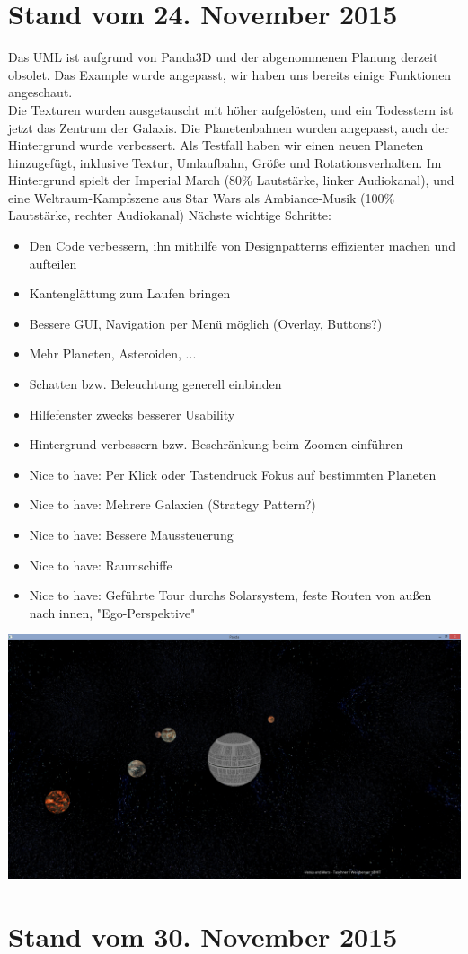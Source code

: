 \documentclass[12pt,a4paper,oneside,ngerman]{scrartcl}
\begin{document}
\section{Stand vom 24. November 2015}
Das UML ist aufgrund von Panda3D und der abgenommenen Planung derzeit obsolet.
Das Example wurde angepasst, wir haben uns bereits einige Funktionen angeschaut. \\
Die Texturen wurden ausgetauscht mit höher aufgelösten, und ein Todesstern ist jetzt das Zentrum der Galaxis. Die Planetenbahnen wurden angepasst, auch der Hintergrund wurde verbessert. Als Testfall haben wir einen neuen Planeten hinzugefügt, inklusive Textur, Umlaufbahn, Größe und Rotationsverhalten. Im Hintergrund spielt der Imperial March (80\% Lautstärke, linker Audiokanal), und eine Weltraum-Kampfszene aus Star Wars als Ambiance-Musik  (100\% Lautstärke, rechter Audiokanal) \newline
Nächste wichtige Schritte:
\begin{itemize}
\item Den Code verbessern, ihn mithilfe von Designpatterns effizienter machen und aufteilen
\item Kantenglättung zum Laufen bringen
\item Bessere GUI, Navigation per Menü möglich (Overlay, Buttons?)
\item Mehr Planeten, Asteroiden, ...
\item Schatten bzw. Beleuchtung generell einbinden
\item Hilfefenster zwecks besserer Usability
\item Hintergrund verbessern bzw. Beschränkung beim Zoomen einführen
\item Nice to have: Per Klick oder Tastendruck Fokus auf bestimmten Planeten
\item Nice to have: Mehrere Galaxien (Strategy Pattern?)
\item Nice to have: Bessere Maussteuerung
\item Nice to have: Raumschiffe
\item Nice to have: Geführte Tour durchs Solarsystem, feste Routen von außen nach innen, "Ego-Perspektive"
\end{itemize}
\includegraphics[width=1\textwidth]{24_11_Screen_1}
\newpage

\section{Stand vom 30. November 2015}
	

\end{document}

